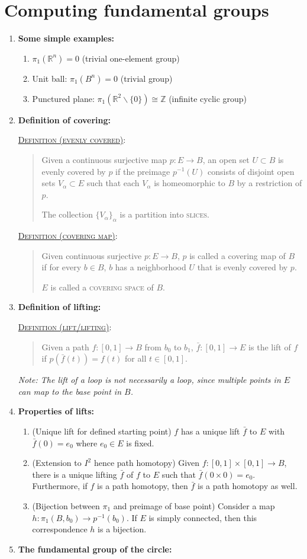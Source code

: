 \documentclass[letterpaper, 12pt]{book}
\newcommand{\RR}{\mathbb{R}}
\newcommand{\ZZ}{\mathbb{Z}}
\newcommand{\defn}[2]{\textsc{\underline{Definition (#1)}:}\begin{quote} #2\end{quote}}
\begin{document}
\section{Computing fundamental groups}
    \begin{enumerate}[resume]
    \item \textbf{Some simple examples:}
        \begin{enumerate}
        \item $\pi_1(\RR^n) = 0$ (trivial one-element group)
        \item Unit ball: $\pi_1(B^n) = 0$ (trivial group)
        \item Punctured plane: $\pi_1(\RR^2\smallsetminus\{0\}) \cong \ZZ$ (infinite cyclic group)
        \end{enumerate}
    \item \textbf{Definition of covering:}

        \defn{evenly covered}{Given a continuous surjective map $p:E\to B$, an open set $U\subset B$ is evenly covered by $p$ if the preimage $p^{-1}(U)$ consists of disjoint open sets $V_\alpha\subset E$ such that each $V_\alpha$ is homeomorphic to $B$ by a restriction of $p$.

        The collection $\{V_\alpha\}_\alpha$ is a partition into \textsc{slices}.}

        \defn{covering map}{Given continuous surjective $p:E\to B$, $p$ is called a covering map of $B$ if for every $b\in B$, $b$ has a neighborhood $U$ that is evenly covered by $p$.

        $E$ is called a \textsc{covering space} of $B$.}
    \item \textbf{Definition of lifting:}

        \defn{lift/lifting}{Given a path $f:[0,1]\to B$ from $b_0$ to $b_1$, $\bar f : [0,1]\to E$ is the lift of $f$ if $p(\bar f(t)) = f(t)$ for all $t\in[0,1]$.}

        \textit{Note: The lift of a loop is not necessarily a loop, since multiple points in $E$ can map to the base point in $B$.}
    \item \textbf{Properties of lifts:}
        \begin{enumerate}
        \item (Unique lift for defined starting point) $f$ has a unique lift $\bar f$ to $E$ with $\bar f(0) = e_0$ where $e_0\in E$ is fixed. %
        \item (Extension to $I^2$ hence path homotopy) Given $f:[0,1]\times [0,1]\to B$, there is a unique lifting $\bar f$ of $f$ to $E$ such that $\bar f(0\times 0) = e_0$. Furthermore, if $f$ is a path homotopy, then $\bar f$ is a path homotopy as well.
        \item (Bijection between $\pi_1$ and preimage of base point) Consider a map $h : \pi_1(B, b_0) \to p^{-1}(b_0)$. If $E$ is simply connected, then this correspondence $h$ is a bijection.
        \end{enumerate}
    \item \textbf{The fundamental group of the circle:}


\end{enumerate}
\end{document}
